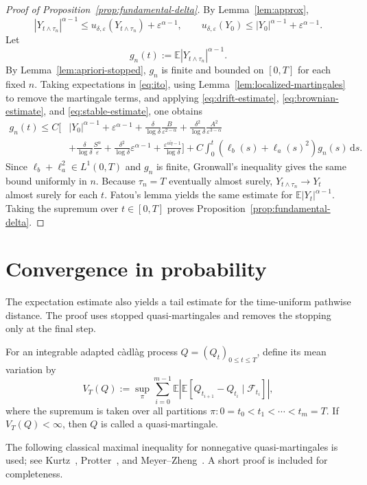 \documentclass[10pt,a4paper]{amsart}
\newcommand{\E}{\mathbb{E}}
\newcommand{\F}{\mathcal{F}}
\newcommand{\1}{\mathbf{1}}
\newcommand{\dd}{\,\mathrm{d}}
\newcommand{\wt}{\tilde}
\newcommand{\eps}{\varepsilon}
\begin{document}
\begin{proof}[Proof of Proposition~\ref{prop:fundamental-delta}]
By Lemma~\ref{lem:approx},
\[
  |Y_{t\wedge\tau_n}|^{\alpha-1}\le u_{\delta,\eps}(Y_{t\wedge\tau_n})+\eps^{\alpha-1},
  \qquad
  u_{\delta,\eps}(Y_0)\le |Y_0|^{\alpha-1}+\eps^{\alpha-1}.
\]
Let
\[
  g_n(t):=\E|Y_{t\wedge\tau_n}|^{\alpha-1}.
\]
By Lemma~\ref{lem:apriori-stopped}, $g_n$ is finite and bounded on $[0,T]$ for each fixed $n$. Taking expectations in \eqref{eq:ito}, using Lemma~\ref{lem:localized-martingales} to remove the martingale terms, and applying \eqref{eq:drift-estimate}, \eqref{eq:brownian-estimate}, and \eqref{eq:stable-estimate}, one obtains
\begin{align*}
g_n(t)
\le C\Bigg[&|Y_0|^{\alpha-1}
+\eps^{\alpha-1}
+\frac{\delta}{\log\delta}\frac{B}{\eps^{2-\alpha}}
+\frac{\delta^2}{\log\delta}\frac{A^2}{\eps^{3-\alpha}}\\
&+\frac{\delta}{\log\delta}\frac{S^\alpha}{\eps}
+\frac{\delta^2}{\log\delta}\eps^{\alpha-1}
+\frac{\eps^{\alpha\wt\eta-1}}{\log\delta}
\Bigg]
+C\int_0^t\left(\ell_b(s)+\ell_a(s)^2\right)g_n(s)\dd s.
\end{align*}
Since $\ell_b+\ell_a^2\in L^1(0,T)$ and $g_n$ is finite, Gronwall's inequality gives the same bound uniformly in $n$. Because $\tau_n=T$ eventually almost surely, $Y_{t\wedge\tau_n}\to Y_t$ almost surely for each $t$. Fatou's lemma yields the same estimate for $\E|Y_t|^{\alpha-1}$. Taking the supremum over $t\in[0,T]$ proves Proposition~\ref{prop:fundamental-delta}.
\end{proof}

\section{Convergence in probability}
\label{sec:probability}

The expectation estimate also yields a tail estimate for the time-uniform pathwise distance. The proof uses stopped quasi-martingales and removes the stopping only at the final step.

For an integrable adapted c\`adl\`ag process $Q=(Q_t)_{0\le t\le T}$, define its mean variation by
\[
  V_T(Q):=\sup_\pi\sum_{i=0}^{m-1}
  \E\left|\E\left[Q_{t_{i+1}}-Q_{t_i}\mid\F_{t_i}\right]\right|,
\]
where the supremum is taken over all partitions $\pi:0=t_0<t_1<\cdots<t_m=T$. If $V_T(Q)<\infty$, then $Q$ is called a quasi-martingale.

The following classical maximal inequality for nonnegative quasi-martingales is used; see Kurtz~\cite[Lemma~5.3]{Kurtz1991}, Protter~\cite[Chapter~III]{Protter2004}, and Meyer--Zheng~\cite{MeyerZheng1984}. A short proof is included for completeness.
\end{document}
